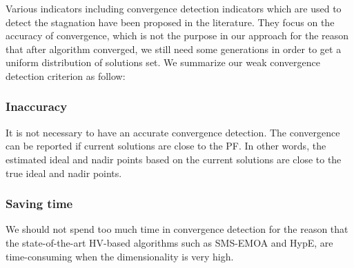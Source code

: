 \documentclass[conference]{IEEEtran}
\begin{document}
%
%
%
Various indicators including convergence detection indicators which are used to detect the stagnation 
have been proposed in the literature\cite{convergenceDetection:1, convergenceDetection:LSSC, 
convergenceDetection:OCD, convergenceDetection:OFCDandOCD, convergenceDetection:convergenceMetric, 
convergenceDetection:maxCD, convergenceDetection:online}. 
They focus on the accuracy of convergence, which is not the purpose in our approach for 
the reason that after algorithm converged, we still need some generations in order to
get a uniform distribution of solutions set. 
We summarize our weak convergence detection criterion as follow:
\subsubsection{Inaccuracy} It is not necessary to have an accurate convergence detection. 
The convergence can be reported if current solutions are close to the PF.
In other words, the estimated ideal and nadir points based on the current solutions
are close to the true ideal and nadir points. 
\subsubsection{Saving time} We should not spend too much time in convergence detection
for the reason that the state-of-the-art HV-based algorithms such as SMS-EMOA and HypE, 
are time-consuming when the dimensionality is very high. 
\end{document}
